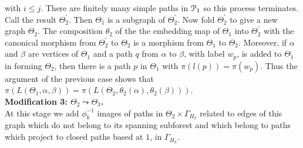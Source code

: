\documentclass[a4paper,12pt]{article}
\renewcommand{\a}{\alpha }
\renewcommand{\b}{\beta }
\newcommand{\G}{\Gamma }
\newcommand{\T}{\Theta }
\newcommand{\cP}{{\cal{P}}}
\numberwithin{equation}{section}
\numberwithin{figure}{section}
\begin{document}
with $i\le j$. There are finitely many simple paths in $\cP_1$ so
this process terminates. Call the result $\T_2^\prime$. Then
$\T_1$ is a subgraph of $\T_2^\prime$. Now fold $\T_2^\prime$ to
give a new graph $\T_2$. The composition $\theta_2$ of the the
embedding map of $\T_1$ into $\T_2^\prime$ with the canonical
morphism from $\T_2^\prime$ to $\T_2$ is a morphism from $\T_1$ to
$\T_2$.
 Moreover, if $\a$ and
 $\b$ are
 vertices of $\T_1$ and
a path $q$ from $\a$ to $\b$, with label $w_p$, is added to $\Theta_1$
in forming $\Theta_2$, then there is a path $p$ in $\Theta_1$ with
$\pi(l(p))=\pi(w_p)$. Thus the argument of the previous case shows that
$\pi(L(\T_1,\a,\b))=\pi(L(\T_2,\theta_2(\a),\theta_2(\b)))$.\\[1em]

\noindent\textbf{Modification 3: $\T_2\leadsto \T_3$.}\\
At this stage we add $\phi_k^{-1}$ images of paths in $\T_2\times
\G_{H_k}$ related to edges of this graph which do not belong to
its spanning subforest and which belong to paths which project 
to closed paths 
based at $1$, in $\G_{H_k}$.
\end{document}
